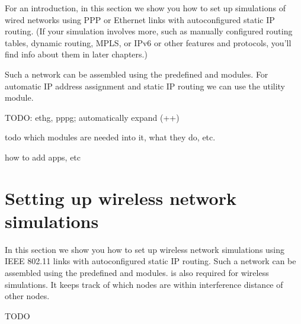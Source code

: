 For an introduction, in this section we show you how to set up simulations
of wired networks using PPP or Ethernet links with autoconfigured static IP
routing. (If your simulation involves more, such as manually configured
routing tables, dynamic routing, MPLS, or IPv6 or other features and protocols,
you'll find info about them in later chapters.)

Such a network can be assembled using the predefined 
and  modules. For automatic IP address assignment and
static IP routing we can use the  utility
module.

TODO:  ethg, pppg;  automatically expand (++)

todo which modules are needed into it, what they do, etc.

how to add apps, etc


\section{Setting up wireless network simulations}

In this section we show you how to set up wireless network simulations using
IEEE 802.11 links with autoconfigured static IP routing. Such a network can be
assembled using the predefined  and 
modules.  is also required for wireless simulations. It
keeps track of which nodes are within interference distance of other nodes.

TODO


